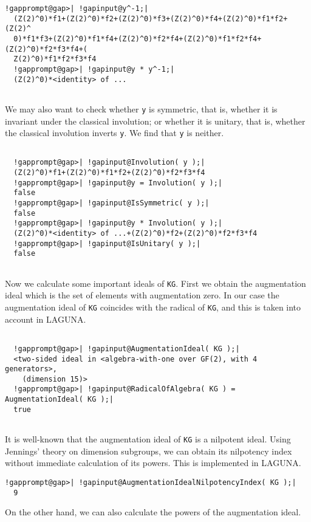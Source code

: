 \documentclass[a4paper,11pt]{report}
\begin{document}
{\begin{Verbatim}[commandchars=!@|,fontsize=\small,frame=single,label=Example]
  !gapprompt@gap>| !gapinput@y^-1;|
  (Z(2)^0)*f1+(Z(2)^0)*f2+(Z(2)^0)*f3+(Z(2)^0)*f4+(Z(2)^0)*f1*f2+(Z(2)^
  0)*f1*f3+(Z(2)^0)*f1*f4+(Z(2)^0)*f2*f4+(Z(2)^0)*f1*f2*f4+(Z(2)^0)*f2*f3*f4+(
  Z(2)^0)*f1*f2*f3*f4
  !gapprompt@gap>| !gapinput@y * y^-1;|
  (Z(2)^0)*<identity> of ... 
  
\end{Verbatim}
 We may also want to check whether \texttt{y} is symmetric, that is, whether it is invariant under the classical involution;
or whether it is unitary, that is, whether the classical involution inverts \texttt{y}. We find that \texttt{y} is neither. 
\begin{Verbatim}[commandchars=!@|,fontsize=\small,frame=single,label=Example]
  
  !gapprompt@gap>| !gapinput@Involution( y );|
  (Z(2)^0)*f1+(Z(2)^0)*f1*f2+(Z(2)^0)*f2*f3*f4
  !gapprompt@gap>| !gapinput@y = Involution( y );|
  false
  !gapprompt@gap>| !gapinput@IsSymmetric( y );|
  false
  !gapprompt@gap>| !gapinput@y * Involution( y );|
  (Z(2)^0)*<identity> of ...+(Z(2)^0)*f2+(Z(2)^0)*f2*f3*f4  
  !gapprompt@gap>| !gapinput@IsUnitary( y );|
  false
  
\end{Verbatim}
 Now we calculate some important ideals of \texttt{KG}. First we obtain the augmentation ideal which is the set of elements with
augmentation zero. In our case the augmentation ideal of \texttt{KG} coincides with the radical of \texttt{KG}, and this is taken into account in \textsf{LAGUNA}. 
\begin{Verbatim}[commandchars=!@|,fontsize=\small,frame=single,label=Example]
  
  !gapprompt@gap>| !gapinput@AugmentationIdeal( KG );|
  <two-sided ideal in <algebra-with-one over GF(2), with 4 generators>,
    (dimension 15)>
  !gapprompt@gap>| !gapinput@RadicalOfAlgebra( KG ) = AugmentationIdeal( KG );|
  true
  
\end{Verbatim}
 It is well-known that the augmentation ideal of \texttt{KG} is a nilpotent ideal. Using Jennings' theory on dimension subgroups, we can
obtain its nilpotency index without immediate calculation of its powers. This
is implemented in \textsf{LAGUNA}. 
\begin{Verbatim}[commandchars=!@|,fontsize=\small,frame=single,label=Example]
  !gapprompt@gap>| !gapinput@AugmentationIdealNilpotencyIndex( KG );|
  9
\end{Verbatim}
 \newpage On the other hand, we can also calculate the powers of the augmentation ideal. 
\begin{Verbatim}[commandchars=!@|,fontsize=\small,frame=single,label=Example]
  

\end{Verbatim}}
\end{document}
